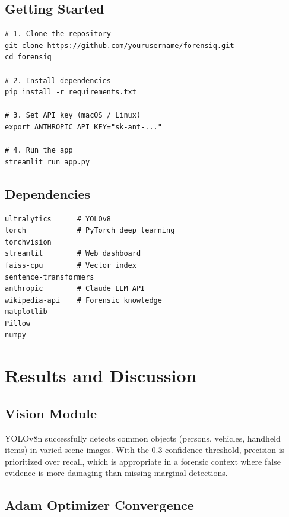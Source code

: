\documentclass[12pt,a4paper]{article}
\begin{document}
\subsection{Getting Started}

\begin{lstlisting}[style=bashstyle, caption={Installation and Launch}]
# 1. Clone the repository
git clone https://github.com/yourusername/forensiq.git
cd forensiq

# 2. Install dependencies
pip install -r requirements.txt

# 3. Set API key (macOS / Linux)
export ANTHROPIC_API_KEY="sk-ant-..."

# 4. Run the app
streamlit run app.py
\end{lstlisting}

\subsection{Dependencies}

\begin{lstlisting}[style=bashstyle]
ultralytics      # YOLOv8
torch            # PyTorch deep learning
torchvision
streamlit        # Web dashboard
faiss-cpu        # Vector index
sentence-transformers
anthropic        # Claude LLM API
wikipedia-api    # Forensic knowledge
matplotlib
Pillow
numpy
\end{lstlisting}

\section{Results and Discussion}

\subsection{Vision Module}

YOLOv8n successfully detects common objects (persons, vehicles, handheld items)
in varied scene images. With the 0.3 confidence threshold, precision is
prioritized over recall, which is appropriate in a forensic context where false
evidence is more damaging than missing marginal detections.

\subsection{Adam Optimizer Convergence}
\end{document}
